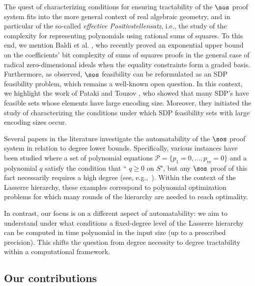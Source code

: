 \documentclass[11pt]{article}
\begin{document}
The quest of characterizing conditions for ensuring tractability of the $\sos$ proof system fits into the more general context of real algebraic geometry, and in particular of the so-called \textit{effective Positivstellensatz}, i.e., the study of the complexity for representing polynomials using rational sums of squares. To this end, we mention Baldi et al. \cite{BaldiKM24}, who recently proved an exponential upper bound on the coefficients' bit complexity of sums of squares proofs in the general case of radical zero-dimensional ideals when the equality constraints form a graded basis.
Furthermore, as observed, $\sos$ feasibility can be reformulated as an SDP feasibility problem, which remains a well-known open question.
In this context, we highlight the work of Pataki and Touzov \cite{PatakiT24}, who showed that many SDP's have feasible sets whose elements have large encoding size. Moreover, they initiated the study of characterizing the conditions under which SDP feasibility sets with large encoding sizes occur.


Several papers in the literature investigate the automatability of the $\sos$ proof system in relation to degree lower bounds. Specifically, various instances have been studied where a set of polynomial equations $\mathcal{P} = \{p_1=0, \ldots, p_m=0\}$ and a polynomial $q$ satisfy the condition that `` $q \geq 0$ on $S$", but any $\sos$ proof of this fact necessarily requires a high degree (see, e.g.,~\cite{GrigorievHP_MMJ02,KLM-hard-prob-formulation,KLM-unbounded-SOS-hierarchy-integrality-gap,KLM-tight-SOS-LB-binary-POP,KLM-SOS-hierarchy-LB-symmetric-formulations,potechin:SOS-LB-from-symmetry}). Within the context of the Lasserre hierarchy, these examples correspond to polynomial optimization problems for which many rounds of the hierarchy are needed to reach optimality.

In contrast, our focus is on a different aspect of automatability: we aim to understand under what conditions a fixed-degree level of the Lasserre hierarchy can be computed in time polynomial in the input size (up to a prescribed precision). This shifts the question from degree necessity to degree tractability within a computational framework.


\subsection{Our contributions}\label{sect:contribution}
\end{document}
